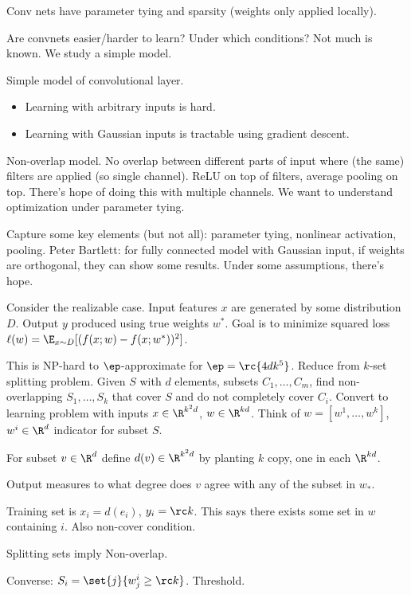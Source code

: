 Conv nets have parameter tying and sparsity (weights only applied locally). 

Are convnets easier/harder to learn? Under which conditions? Not much is known. We study a simple model.

Simple model of convolutional layer.
\begin{itemize}
\item
Learning with arbitrary inputs is hard.
\item
Learning with Gaussian inputs is tractable using gradient descent.
\end{itemize}

Non-overlap model. No overlap between different parts of input where (the same) filters are applied (so single channel). ReLU on top of filters, average pooling on top. There's hope of doing this with multiple channels.
We want to understand optimization under parameter tying.

Capture some key elements (but not all): parameter tying, nonlinear activation, pooling. Peter Bartlett: for fully connected model with Gaussian input, if weights are orthogonal, they can show some results. Under some assumptions, there's hope. 

Consider the realizable case. Input features $x$ are generated by some distribution $D$. Output $y$ produced using true weights $w^*$. Goal is to minimize squared loss $\ell(w) = \E_{x\sim D} [(f(x;w)-f(x;w^*))^2]$. 


This is NP-hard to $\ep$-approximate for $\ep=\rc{4dk^5}$. Reduce from $k$-set splitting problem. Given $S$ with $d$ elements, subsets $C_1,\ldots, C_m$, find non-overlapping $S_1,\ldots, S_k$ that cover $S$ and do not completely cover $C_i$.
Convert to learning problem with inputs $x\in \R^{k^2d}$, $w\in \R^{kd}$. Think of $w=[w^1,\ldots, w^k]$, $w^i\in \R^d$ indicator for subset $S$.

For subset $v\in \R^d$ define $d(v)\in \R^{k^2d}$ by planting $k$ copy, one in each $\R^{kd}$.

Output measures to what degree does $v$ agree with any of the subset in $w_*$.

Training set is $x_i=d(e_i)$, $y_i=\rc k$. This says there exists some set in $w$ containing $i$. Also non-cover condition.

Splitting sets imply Non-overlap.

Converse: $S_i = \set{j}{w_j^i \ge \rc k}$. Threshold. %

